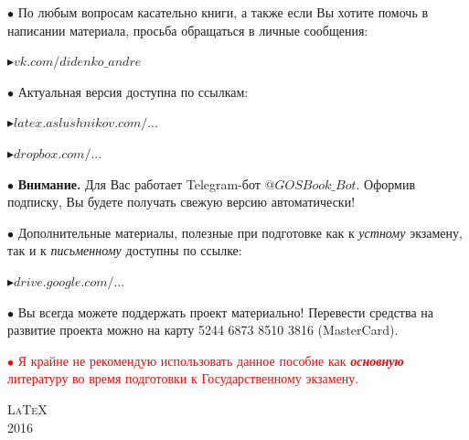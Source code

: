 \begin{flushleft}
$\bullet$ По любым вопросам касательно книги, а также если Вы хотите помочь в написании материала, просьба обращаться в личные сообщения: 

\vspace*{0.2\baselineskip}

\qquad\textcolor{Purplemountainmajesty}{$\blacktriangleright$}\href{https://vk.com/didenko_andre}{\large$vk.com/didenko\_andre$}

\vfill

$\bullet$ Актуальная версия доступна по ссылкам:

\vspace*{0.2\baselineskip}

\qquad\textcolor{Purplemountainmajesty}{$\blacktriangleright$}\href{http://latex.aslushnikov.com/compile?git=https://github.com/DidenkoAndre/GOS_book&target=_main.tex}{\large \textcolor{Purplemountainmajesty}{$latex.aslushnikov.com/...$}}

\vspace*{0.2\baselineskip}

\qquad\textcolor{Purplemountainmajesty}{$\blacktriangleright$}\href{https://www.dropbox.com/sh/7e5mfj8q68o2ipp/AAD8XvpZhiJzFbEh_IeH305ia?dl=0&preview=GOSBook.pdf}{\large \textcolor{Purplemountainmajesty}{$dropbox.com/...$}}

\vfill

$\bullet$ \textbf{Внимание.} Для Вас работает Telegram-бот \href{https://t.me/GOSBook_Bot}{\textcolor{PersianBlue}{$@GOSBook\_Bot$}}. Оформив подписку\footnotemark{}, Вы будете получать свежую версию автоматически!


\vfill

$\bullet$ Дополнительные материалы, полезные при подготовке как к \textit{устному} экзамену, так и к \textit{письменному} доступны по ссылке:

\vspace*{0.2\baselineskip}

\qquad\textcolor{Purplemountainmajesty}{$\blacktriangleright$}\href{https://drive.google.com/drive/u/0/folders/0BzuzEyNkpwYDYjVNcE0wa3hqWjA}{\large $drive.google.com/...$}

\vfill

$\bullet$ Вы всегда можете поддержать проект материально! 
Перевести средства на развитие проекта можно на карту {\large 5244 6873 8510 3816} \textsf{(MasterCard)}.

\bigskip
\vfill

\bigskip
\vfill

\textcolor{red}{
$\bullet$ Я крайне не рекомендую использовать данное пособие как \textit{\textbf{основную}} литературу во время подготовки к Государственному экзамену.
}
\end{flushleft}

\vfill
{\LARGE\scshape \LaTeX}\\[0.5\baselineskip]
{\LARGE\scshape 2016}\par
\restoregeometry
\endgroup
\newpage